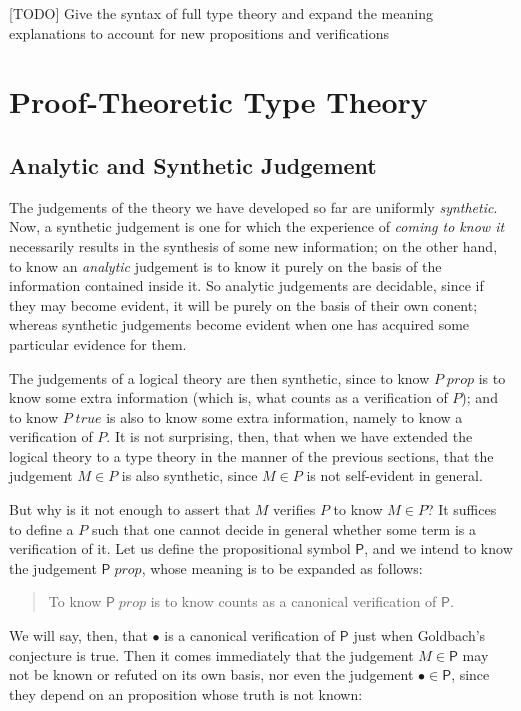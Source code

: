\documentclass{amsart}
\theoremstyle{definition}
\theoremstyle{remark}
\numberwithin{equation}{section}
\newcommand\isprop[1]{\ensuremath{#1\;\mathit{prop}}}
\newcommand\istrue[1]{\ensuremath{#1\;\mathit{true}}}
\newcommand\ver[2]{\ensuremath{#1\in#2}}
\begin{document}
[TODO] Give the syntax of full type theory and expand the meaning explanations
to account for new propositions and verifications


\section{Proof-Theoretic Type Theory}

\subsection{Analytic and Synthetic Judgement}

The judgements of the theory we have developed so far are uniformly
\emph{synthetic}. Now, a synthetic judgement is one for which the experience of
\emph{coming to know it} necessarily results in the synthesis of some new
information; on the other hand, to know an \emph{analytic} judgement is to know
it purely on the basis of the information contained inside it. So analytic
judgements are decidable, since if they may become evident, it will be purely
on the basis of their own conent; whereas synthetic judgements become evident
when one has acquired some particular evidence for them.

The judgements of a logical theory are then synthetic, since to know \isprop{P}
is to know some extra information (which is, what counts as a verification of
$P$); and to know \istrue{P} is also to know some extra information, namely to
know a verification of $P$. It is not surprising, then, that when we have
extended the logical theory to a type theory in the manner of the previous
sections, that the judgement \ver{M}{P} is also synthetic, since \ver{M}{P} is
not self-evident in general.

But why is it not enough to assert that $M$ verifies $P$ to know \ver{M}{P}? It
suffices to define a $P$ such that one cannot decide in general whether some
term is a verification of it. Let us define the propositional symbol
$\mathsf{P}$, and we intend to know the judgement \isprop{\mathsf{P}}, whose
meaning is to be expanded as follows:
\begin{quote}
  To know \isprop{\mathsf{P}} is to know counts as a canonical verification of $\mathsf{P}$.
\end{quote}

We will say, then, that $\bullet$ is a canonical verification of $\mathsf{P}$
just when Goldbach's conjecture is true. Then it comes immediately that the
judgement \ver{M}{\mathsf{P}} may not be known or refuted on its own basis, nor
even the judgement \ver{\bullet}{\mathsf{P}}, since they depend on an
proposition whose truth is not known:
\end{document}
